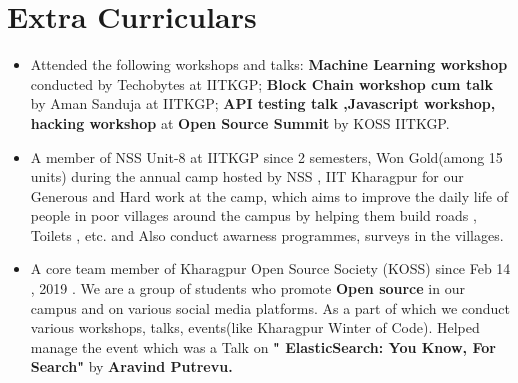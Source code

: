 \documentclass[letterpaper,11pt]{article}
\newcommand{\resumeSubHeadingListStart}{\begin{itemize}[leftmargin=*]}
\newcommand{\resumeSubHeadingListEnd}{\end{itemize}}
\begin{document}
\section{Extra Curriculars}
  \resumeSubHeadingListStart
    \item{
      {Attended the following workshops and talks}{: }    \textbf{Machine Learning workshop} { conducted by Techobytes at IITKGP; }    \textbf{Block Chain workshop cum talk} { by Aman Sanduja at IITKGP; } \textbf{API testing talk ,Javascript workshop, hacking workshop }{at }\textbf{Open Source Summit} { by KOSS IITKGP.}
      \hfill
    }
    \item{
      {A member of NSS Unit-8 at IITKGP since 2 semesters, Won Gold(among 15 units) during the annual camp hosted by NSS , IIT Kharagpur for our Generous and Hard work at the camp, which aims to improve the daily life of people in poor villages around the campus by helping them build  roads , Toilets , etc. and Also conduct awarness programmes, surveys in the villages. }
      \hfill
    }
    \item{
      {A core team member of Kharagpur Open Source Society (KOSS) since Feb 14 , 2019 . We are a group of students who promote }    \textbf{Open source}{ in our campus and on various social media platforms. As a part of which we conduct various workshops, talks, events(like Kharagpur Winter of Code). 
      Helped manage the event which  was a Talk on } \textbf{" ElasticSearch: You Know, For Search"} {by} \textbf{ Aravind Putrevu.}
      \hfill
    }

  \resumeSubHeadingListEnd
\end{document}
